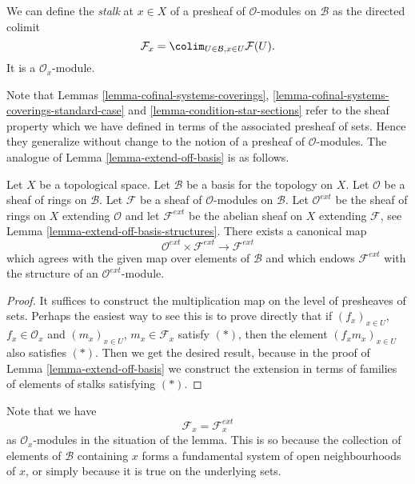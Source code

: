 \noindent
We can define the {\it stalk} at $x \in X$
of a presheaf of $\mathcal{O}$-modules on $\mathcal{B}$
as the directed colimit
$$
\mathcal{F}_x = \colim_{U\in \mathcal{B}, x\in U} \mathcal{F}(U).
$$
It is a $\mathcal{O}_x$-module.

\medskip\noindent
Note that Lemmas \ref{lemma-cofinal-systems-coverings},
\ref{lemma-cofinal-systems-coverings-standard-case} and
\ref{lemma-condition-star-sections} refer to the sheaf
property which we have defined in terms of the associated presheaf
of sets. Hence they generalize without change to the notion
of a presheaf of $\mathcal{O}$-modules. The analogue of
Lemma \ref{lemma-extend-off-basis} is as follows.

\begin{lemma}
\label{lemma-extend-off-basis-module}
Let $X$ be a topological space.
Let $\mathcal{B}$ be a basis for the topology on $X$.
Let $\mathcal{O}$ be a sheaf of rings on $\mathcal{B}$.
Let $\mathcal{F}$ be a sheaf of $\mathcal{O}$-modules
on $\mathcal{B}$. Let $\mathcal{O}^{ext}$ be the sheaf
of rings on $X$ extending $\mathcal{O}$ and let
$\mathcal{F}^{ext}$ be the abelian sheaf on $X$ extending
$\mathcal{F}$, see Lemma \ref{lemma-extend-off-basis-structures}.
There exists a canonical map
$$
\mathcal{O}^{ext} \times \mathcal{F}^{ext}
\longrightarrow
\mathcal{F}^{ext}
$$
which agrees with the given map over elements of $\mathcal{B}$
and which endows $\mathcal{F}^{ext}$ with the structure
of an $\mathcal{O}^{ext}$-module.
\end{lemma}

\begin{proof}
It suffices to construct the multiplication map
on the level of presheaves of sets. Perhaps the easiest
way to see this is to prove directly that if
$(f_x)_{x \in U}$, $f_x \in \mathcal{O}_x$
and
$(m_x)_{x \in U}$, $m_x \in \mathcal{F}_x$
satisfy $(*)$, then the element
$(f_xm_x)_{x \in U}$ also satisfies $(*)$.
Then we get the desired result, because in the proof
of Lemma \ref{lemma-extend-off-basis} we construct the extension
in terms of families of elements of stalks satisfying $(*)$.
\end{proof}

\noindent
Note that we have
$$
\mathcal{F}_x = \mathcal{F}_x^{ext}
$$
as $\mathcal{O}_x$-modules in the situation of the lemma.
This is so because the collection of elements of $\mathcal{B}$ containing
$x$ forms a fundamental system of open neighbourhoods of $x$, or
simply because it is true on the underlying sets.

